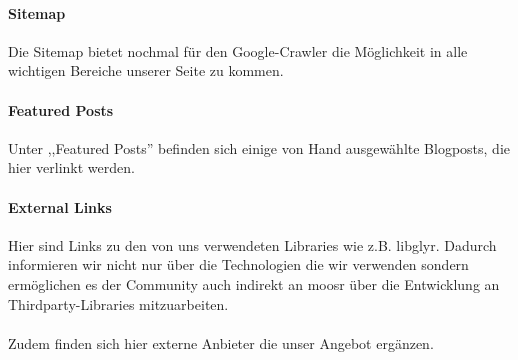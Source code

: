 \paragraph{Sitemap}
Die Sitemap bietet nochmal für den Google-Crawler die Möglichkeit in
alle wichtigen Bereiche unserer Seite zu kommen.
\paragraph{Featured Posts}
Unter ,,Featured Posts'' befinden sich einige von Hand ausgewählte Blogposts,
die hier verlinkt werden.

\paragraph{External Links}
Hier sind Links zu den von uns verwendeten Libraries wie z.B. libglyr. Dadurch
informieren wir nicht nur über die Technologien die wir verwenden sondern
ermöglichen es der Community auch indirekt an moosr über die Entwicklung an
Thirdparty-Libraries mitzuarbeiten.
\\
\\
Zudem finden sich hier externe Anbieter die unser Angebot ergänzen.
